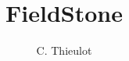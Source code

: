 



\usepackage{amsthm}
\newtheorem*{remark}{Remark}
\newtheorem{problem}{problem:}
\newtheorem{problem-bonus}{problem*}
\newtheorem{exercise}{Exercise:}

\usepackage[maxnames=6]{biblatex}

 

\title{FieldStone}
\author{C. Thieulot}


\usepackage{multind}
 
